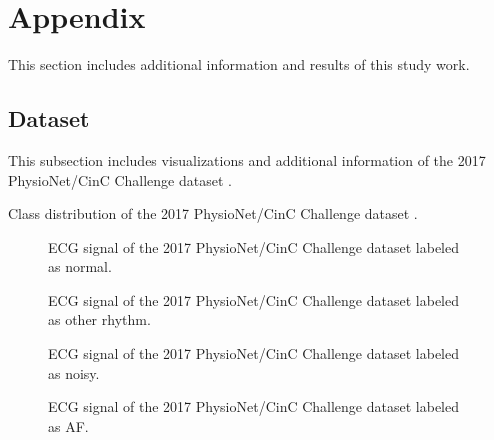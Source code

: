 \section{Appendix} \label{sec:appendix}

This section includes additional information and results of this study work.

\subsection{Dataset} \label{subsec:dataset_samples}

This subsection includes visualizations and additional information of the 2017 PhysioNet/CinC Challenge dataset \cite{Clifford2017}.

\begin{table}[!ht]
    \centering
    \caption{Class distribution of the 2017 PhysioNet/CinC Challenge dataset \cite{Clifford2017}.}
    
    \label{tab:physionet_distribution}
\end{table}

\begin{figure}[!ht]
    \setlength{\figH}{4cm}
    \setlength{\figW}{88.9mm}
    \centering
    
    \caption{ECG signal of the 2017 PhysioNet/CinC Challenge dataset \cite{Clifford2017} labeled as normal.}
    \label{fig:ecg_signal_N}
\end{figure}

\begin{figure}[!ht]
    \setlength{\figH}{4cm}
    \setlength{\figW}{88.9mm}
    \centering
    
    \caption{ECG signal of the 2017 PhysioNet/CinC Challenge dataset \cite{Clifford2017} labeled as other rhythm.}
    \label{fig:ecg_signal_O}
\end{figure}

\begin{figure}[!ht]
    \setlength{\figH}{4cm}
    \setlength{\figW}{88.9mm}
    \centering
    
    \caption{ECG signal of the 2017 PhysioNet/CinC Challenge dataset \cite{Clifford2017} labeled as noisy.}
    \label{fig:ecg_signal_tild}
\end{figure}

\begin{figure}[!ht]
    \setlength{\figH}{4cm}
    \setlength{\figW}{88.9mm}
    \centering
    
    \caption{ECG signal of the 2017 PhysioNet/CinC Challenge dataset \cite{Clifford2017} labeled as AF.}
    \label{fig:ecg_signal_A}
\end{figure}


